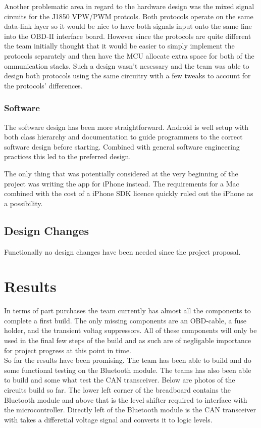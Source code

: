 \documentclass[12pt,letterpaper]{article}
\begin{document}
Another problematic area in regard to the hardware design was the mixed signal circuits for the J1850 VPW/PWM protcols. Both protocols operate on the same data-link layer so it would be nice to have both signals input onto the same line into the OBD-II interface board. However since the protocols are quite different the team initially thought that it would be easier to simply implement the protocols separately and then have the MCU allocate extra space for both of the ommunication stacks. Such a design wasn't nesessary and the team was able to design both protocols using the same circuitry with a few tweaks to account for the protocols' differences.

\subsubsection{Software}
The software design has been more straightforward. Android is well setup with both class hierarchy and documentation to guide programmers to the correct software design before starting. Combined with general software engineering practices this led to the preferred design. 

The only thing that was potentially considered at the very beginning of the project was writing the app for iPhone instead. The requirements for a Mac combined with the cost of a iPhone SDK licence quickly ruled out the iPhone as a possibility. 


\subsection{Design Changes}
Functionally no design changes have been needed since the project proposal.

\section{Results}
In terms of part purchases the team currently has almost all the components to complete a first build. The only missing components are an OBD-cable, a fuse holder, and the transient voltag suppressors. All of these components will only be used in the final few steps of the build and as such are of negligable importance for project progress at this point in time. \\

So far the results have been promising. The team has been able to build and do some functional testing on the Bluetooth module. The teams has also been able to build and some what test the CAN transceiver. Below are photos of the circuits build so far. The lower left corner of the breadboard contains the Bluetooth module and above that is the level shifter required to interface with the microcontroller. Directly left of the Bluetooth module is the CAN transceiver with takes a differetial voltage signal and converts it to logic levels. \\
\end{document}
